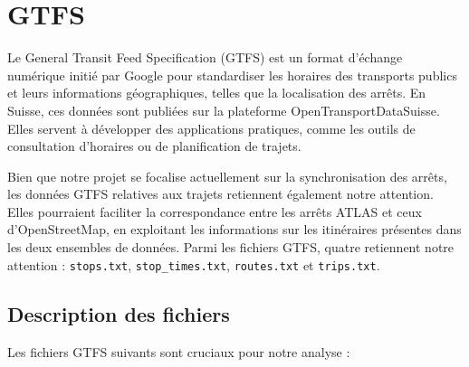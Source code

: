 \section{GTFS}

Le General Transit Feed Specification (GTFS) est un format d'échange numérique initié par Google pour standardiser les horaires des transports publics et leurs informations géographiques, telles que la localisation des arrêts. En Suisse, ces données sont publiées sur la plateforme OpenTransportDataSuisse. Elles servent à développer des applications pratiques, comme les outils de consultation d'horaires ou de planification de trajets.

Bien que notre projet se focalise actuellement sur la synchronisation des arrêts, les données GTFS relatives aux trajets retiennent également notre attention. Elles pourraient faciliter la correspondance entre les arrêts ATLAS et ceux d’OpenStreetMap, en exploitant les informations sur les itinéraires présentes dans les deux ensembles de données. Parmi les  fichiers GTFS, quatre retiennent notre attention : \texttt{stops.txt}, \texttt{stop\_times.txt}, \texttt{routes.txt} et \texttt{trips.txt}.

\subsection{Description des fichiers}

Les fichiers GTFS suivants sont cruciaux pour notre analyse :

